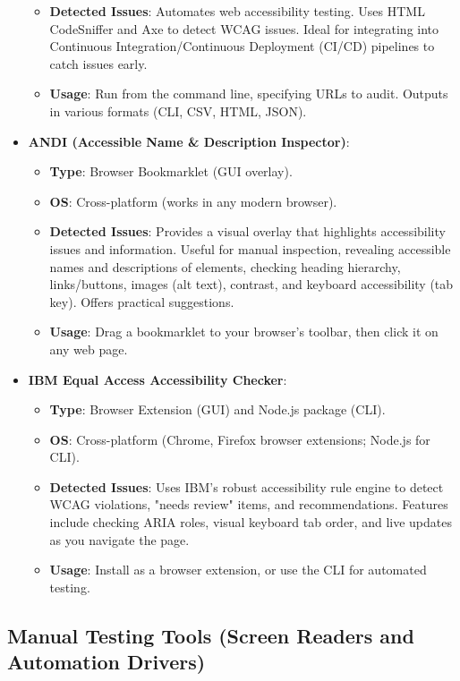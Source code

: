 \begin{itemize}
\begin{itemize}
            \item \textbf{Detected Issues}: Automates web accessibility testing. Uses HTML CodeSniffer and Axe to detect WCAG issues. Ideal for integrating into Continuous Integration/Continuous Deployment (CI/CD) pipelines to catch issues early.
            \item \textbf{Usage}: Run from the command line, specifying URLs to audit. Outputs in various formats (CLI, CSV, HTML, JSON).
        \end{itemize}
    \item \textbf{ANDI (Accessible Name & Description Inspector)}\cite{ANDI}:
        \begin{itemize}
            \item \textbf{Type}: Browser Bookmarklet (GUI overlay).
            \item \textbf{OS}: Cross-platform (works in any modern browser).
            \item \textbf{Detected Issues}: Provides a visual overlay that highlights accessibility issues and information. Useful for manual inspection, revealing accessible names and descriptions of elements, checking heading hierarchy, links/buttons, images (alt text), contrast, and keyboard accessibility (tab key). Offers practical suggestions.
            \item \textbf{Usage}: Drag a bookmarklet to your browser's toolbar, then click it on any web page.
        \end{itemize}
    \item \textbf{IBM Equal Access Accessibility Checker}\cite{IBMChecker}:
        \begin{itemize}
            \item \textbf{Type}: Browser Extension (GUI) and Node.js package (CLI).
            \item \textbf{OS}: Cross-platform (Chrome, Firefox browser extensions; Node.js for CLI).
            \item \textbf{Detected Issues}: Uses IBM's robust accessibility rule engine to detect WCAG violations, "needs review" items, and recommendations. Features include checking ARIA roles, visual keyboard tab order, and live updates as you navigate the page.
            \item \textbf{Usage}: Install as a browser extension, or use the CLI for automated testing.
        \end{itemize}
\end{itemize}

\subsection{Manual Testing Tools (Screen Readers and Automation Drivers)}

